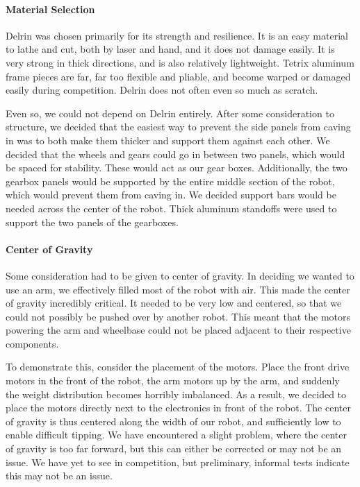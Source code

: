\paragraph{Material Selection} Delrin was chosen primarily for its strength and resilience. It is an easy material to lathe and cut, both by laser and hand, and it does not damage easily. It is very strong in thick directions, and is also relatively lightweight. Tetrix aluminum frame pieces are far, far too flexible and pliable, and become warped or damaged easily during competition. Delrin does not often even so much as scratch.

Even so, we could not depend on Delrin entirely. After some consideration to structure, we decided that the easiest way to prevent the side panels from caving in was to both make them thicker and support them against each other. We decided that the wheels and gears could go in between two panels, which would be spaced for stability. These would act as our gear boxes. Additionally, the two gearbox panels would be supported by the entire middle section of the robot, which would prevent them from caving in. We decided support bars would be needed across the center of the robot. Thick aluminum standoffs were used to support the two panels of the gearboxes.

\paragraph{Center of Gravity} Some consideration had to be given to center of gravity. In deciding we wanted to use an arm, we effectively filled most of the robot with air. This made the center of gravity incredibly critical. It needed to be very low and centered, so that we could not possibly be pushed over by another robot. This meant that the motors powering the arm and wheelbase could not be placed adjacent to their respective components. 

To demonstrate this, consider the placement of the motors. Place the front drive motors in the front of the robot, the arm motors up by the arm, and suddenly the weight distribution becomes horribly imbalanced. As a result, we decided to place the motors directly next to the electronics in front of the robot. The center of gravity is thus centered along the width of our robot, and sufficiently low to enable difficult tipping. We have encountered a slight problem, where the center of gravity is too far forward, but this can either be corrected or may not be an issue. We have yet to see in competition, but preliminary, informal tests indicate this may not be an issue. 


